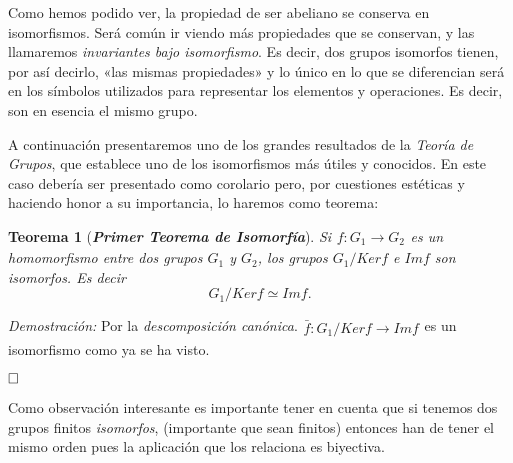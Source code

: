 \documentclass[12pt]{article}
\newtheorem{theorem}{Teorema}[section]
\begin{document}
Como hemos podido ver, la propiedad de ser abeliano se conserva en isomorfismos. Será común ir viendo más propiedades que se conservan, y las llamaremos \textit{invariantes bajo isomorfismo}. Es decir, dos grupos isomorfos tienen, por así decirlo, «las mismas propiedades» y lo único en lo que se diferencian será en los símbolos utilizados para representar los elementos y operaciones. Es decir, son en esencia el mismo grupo.

A continuación presentaremos uno de los grandes resultados de la \textit{Teoría de Grupos}, que establece uno de los isomorfismos más útiles y conocidos. En este caso debería ser presentado como corolario pero, por cuestiones estéticas y haciendo honor a su importancia, lo haremos como teorema:

\begin{theorem}[\textit{\textbf{Primer Teorema de Isomorfía}}]
Si$
\begin{array}{rccl}
f\colon G_{1} \longrightarrow  G_{2}
\end{array}
$es un homomorfismo entre dos grupos $G_{1}$ y $G_{2}$, los grupos $G_{1}/Ker f$ e $Im f$ son isomorfos. Es decir
$$G_{1}/Ker f \simeq Im f.$$
\end{theorem}
\emph{Demostración: }Por la \textit{descomposición canónica}.$
\begin{array}{rccl}
\bar{f}\colon G_{1}/Ker f \longrightarrow  Im f
\end{array}
$es un isomorfismo como ya se ha visto.

$\hfill \square$

Como observación interesante es importante tener en cuenta que si tenemos dos grupos finitos \textit{isomorfos}, (importante que sean finitos) entonces han de tener el mismo orden pues la aplicación que los relaciona es biyectiva.
\end{document}
